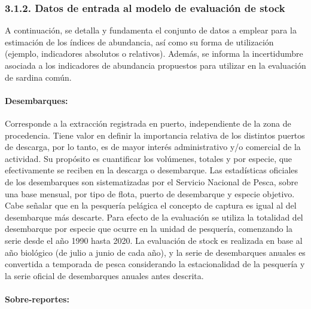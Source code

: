\documentclass[
  spanish,
]{article}
\begin{document}
\hypertarget{datos-de-entrada-al-modelo-de-evaluaciuxf3n-de-stock}{%
\subsubsection{3.1.2. Datos de entrada al modelo de evaluación de
stock}\label{datos-de-entrada-al-modelo-de-evaluaciuxf3n-de-stock}}

A continuación, se detalla y fundamenta el conjunto de datos a emplear
para la estimación de los índices de abundancia, así como su forma de
utilización (ejemplo, indicadores absolutos o relativos). Además, se
informa la incertidumbre asociada a los indicadores de abundancia
propuestos para utilizar en la evaluación de sardina común.

\hypertarget{desembarques}{%
\paragraph{Desembarques:}\label{desembarques}}

Corresponde a la extracción registrada en puerto, independiente de la
zona de procedencia. Tiene valor en definir la importancia relativa de
los distintos puertos de descarga, por lo tanto, es de mayor interés
administrativo y/o comercial de la actividad. Su propósito es
cuantificar los volúmenes, totales y por especie, que efectivamente se
reciben en la descarga o desembarque. Las estadísticas oficiales de los
desembarques son sistematizadas por el Servicio Nacional de Pesca, sobre
una base mensual, por tipo de flota, puerto de desembarque y especie
objetivo. Cabe señalar que en la pesquería pelágica el concepto de
captura es igual al del desembarque más descarte. Para efecto de la
evaluación se utiliza la totalidad del desembarque por especie que
ocurre en la unidad de pesquería, comenzando la serie desde el año 1990
hasta 2020. La evaluación de stock es realizada en base al año biológico
(de julio a junio de cada año), y la serie de desembarques anuales es
convertida a temporada de pesca considerando la estacionalidad de la
pesquería y la serie oficial de desembarques anuales antes descrita.

\hypertarget{sobre-reportes}{%
\paragraph{Sobre-reportes:}\label{sobre-reportes}}
\end{document}
